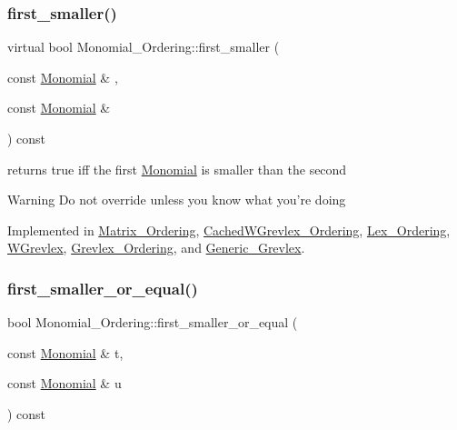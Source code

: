 \subsubsection{\texorpdfstring{first\+\_\+smaller()}{first\_smaller()}}
{\footnotesize\ttfamily virtual bool Monomial\+\_\+\+Ordering\+::first\+\_\+smaller (\begin{DoxyParamCaption}\item[{const \hyperlink{class_monomial}{Monomial} \&}]{,  }\item[{const \hyperlink{class_monomial}{Monomial} \&}]{ }\end{DoxyParamCaption}) const\hspace{0.3cm}{\ttfamily [pure virtual]}}



returns {\ttfamily true} iff the first \hyperlink{class_monomial}{Monomial} is smaller than the second 

\begin{DoxyWarning}{Warning}
Do not override unless you know what you're doing 
\end{DoxyWarning}


Implemented in \hyperlink{class_matrix___ordering_a65ec89b1e3968a9f2a1101088a0af60b}{Matrix\+\_\+\+Ordering}, \hyperlink{class_cached_w_grevlex___ordering_abcb7c620cce85cc4b94bf742fc1cafc3}{Cached\+W\+Grevlex\+\_\+\+Ordering}, \hyperlink{class_lex___ordering_a4bd884b31cd9756e7d3cf6825d5a3210}{Lex\+\_\+\+Ordering}, \hyperlink{class_w_grevlex_acfd20ecab0b278322ecc7b60e52b6d40}{W\+Grevlex}, \hyperlink{class_grevlex___ordering_af2780cccdbe6e89eafefb6bca6088916}{Grevlex\+\_\+\+Ordering}, and \hyperlink{class_generic___grevlex_a66a1f09fffbdb319fd130941880c7848}{Generic\+\_\+\+Grevlex}.

\mbox{\label{class_monomial___ordering_ac9234fccc26cca2aee57e28af7b61880}} 
\subsubsection{\texorpdfstring{first\+\_\+smaller\+\_\+or\+\_\+equal()}{first\_smaller\_or\_equal()}}
{\footnotesize\ttfamily bool Monomial\+\_\+\+Ordering\+::first\+\_\+smaller\+\_\+or\+\_\+equal (\begin{DoxyParamCaption}\item[{const \hyperlink{class_monomial}{Monomial} \&}]{t,  }\item[{const \hyperlink{class_monomial}{Monomial} \&}]{u }\end{DoxyParamCaption}) const}



